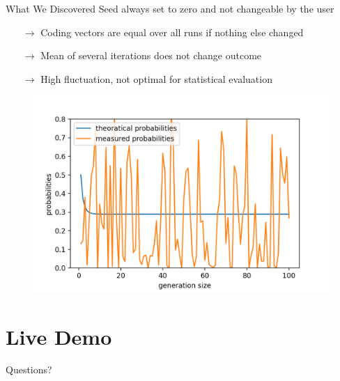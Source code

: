 \documentclass[t]{beamer} %
\begin{document}
\begin{frame}{What We Discovered}
	Seed always set to zero and not changeable by the user
	\begin{itemize}
		\item[$\rightarrow$] Coding vectors are equal over all runs if nothing else changed
		\item[$\rightarrow$] Mean of several iterations does not change outcome
		\item[$\rightarrow$] High fluctuation, not optimal for statistical evaluation
	\end{itemize}
	\begin{figure}[htb]
		\centering
		\includegraphics[scale=0.45]{figures/gf2_noseed}
	\end{figure}
\end{frame}

\section{Live Demo}

\begin{frame}[standout]
	Questions?
\end{frame}


\end{document}
